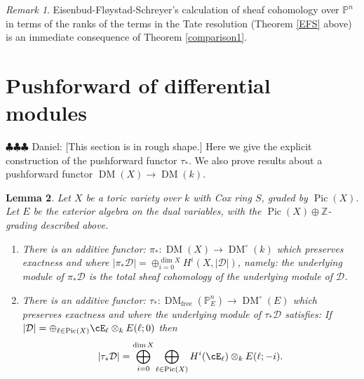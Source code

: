 \documentclass[12pt]{amsart}
\newtheorem{lemma}{Lemma}[section]
\theoremstyle{definition}
\theoremstyle{remark}
\newtheorem{rem}[lemma]{Remark}
\newcommand{\PP}{\mathbb P}
\newcommand{\ZZ}{\mathbb Z}
\newcommand{\Pic}{\operatorname{Pic}}
\newcommand{\daniel}[1]{{\color{blue} \sf $\clubsuit\clubsuit\clubsuit$ Daniel: [#1]}}
\def\DM{\operatorname{DM}}
\def\free{\operatorname{free}}
\begin{document}
\begin{rem}
Eisenbud-Fl\o ystad-Schreyer's calculation of sheaf cohomology over $\PP^n$ in terms of the ranks of the terms in the Tate resolution (Theorem \ref{EFS} above) is an immediate consequence of Theorem \ref{comparison1}. 
\end{rem}


\section{Pushforward of differential modules}\label{sec:tau}
\daniel{This section is in rough shape.}
Here we give the explicit construction of the pushforward functor $\tau_*$.  We also prove results about a pushforward functor $\DM(X)\to \DM(k)$.
\begin{lemma}\label{lemma:tau}
Let $X$ be a toric variety over $k$ with Cox ring $S$, graded by $\Pic(X)$.  Let $E$ be the exterior algebra on the dual variables, with the $\Pic(X)\oplus \ZZ$-grading described above.
\begin{enumerate}
	\item There is an additive functor: $\pi_*\colon \DM(X)\to \DM^\circ (k)$ which preserves exactness and where $|\pi_* \mathcal D| =\oplus_{i=0}^{\dim X} H^i(X, |\mathcal D|)$, namely: the underlying module of $\pi_* \mathcal D$ is the total sheaf cohomology of the underlying module of $\mathcal D$.
	\item There is an additive functor: $\tau_*\colon \DM_{\free}(\PP^n_E)\to \DM^\circ(E)$ which preserves exactness and where the underlying module of $\tau_*\mathcal D$ satisfies: If $|\mathcal D| =\oplus_{\ell\in \Pic(X)} \cE_\ell\otimes_k E(\ell;0)$ then
	\begin{equation}\label{eqn:underlying module}
	 |\tau_*\mathcal D| =\bigoplus_{i=0}^{\dim X}\bigoplus_{\ell\in \Pic(X)} H^i(\cE_\ell)\otimes_k E(\ell;-i).
	 \end{equation}
	\end{enumerate}
\end{lemma}
\end{document}
